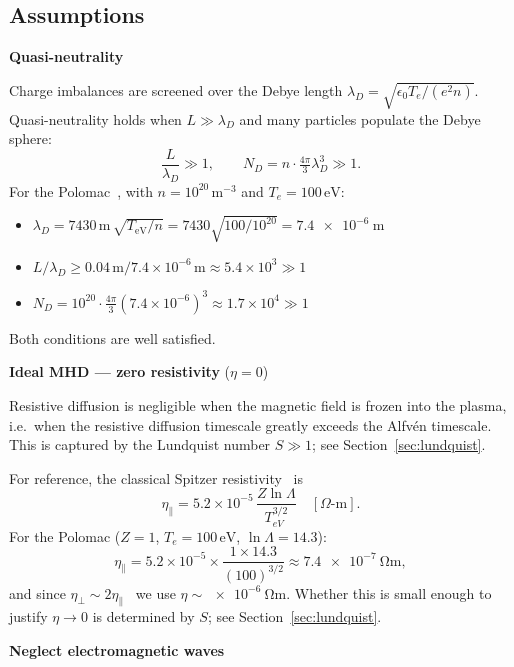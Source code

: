 \begin{enumerate}
{\subsection{Assumptions}


\item \textbf{Quasi-neutrality}

Charge imbalances are screened over the Debye length
$\lambda_D = \sqrt{\epsilon_0 T_e/(e^2 n)}$.  Quasi-neutrality holds
when $L \gg \lambda_D$ and many particles populate the Debye sphere:
\[
    \frac{L}{\lambda_D} \gg 1, \qquad
    N_D = n\cdot\tfrac{4\pi}{3}\lambda_D^3 \gg 1.
\]
For the Polomac~\cite{Elio2024}, with $n=10^{20}\,\text{m}^{-3}$ and
$T_e=100\,\text{eV}$:
\begin{itemize}
    \item $\lambda_D
          = 7430\,\text{m}\,\sqrt{T_\text{eV}/n}
          = 7430\sqrt{100/10^{20}}
          = \SI{7.4e-6}{\meter}$
    \item $L/\lambda_D
          \geq 0.04\,\text{m}/7.4\times10^{-6}\,\text{m}
          \approx 5.4\times10^3 \gg 1$
    \item $N_D
          = 10^{20}\cdot\tfrac{4\pi}{3}(7.4\times10^{-6})^3
          \approx 1.7\times10^4 \gg 1$
\end{itemize}
Both conditions are well satisfied.

\item \textbf{Ideal MHD — zero resistivity} ($\eta = 0$)

Resistive diffusion is negligible when the magnetic field is frozen into
the plasma, i.e.\ when the resistive diffusion timescale greatly exceeds
the Alfv\'en timescale.  This is captured by the Lundquist number
$S \gg 1$; see Section~\ref{sec:lundquist}.

For reference, the classical Spitzer resistivity~\cite{Chen2016} is
\[
    \eta_\parallel
    = 5.2\times10^{-5}\,\frac{Z\ln\Lambda}{T_{eV}^{3/2}}
    \quad[\Omega\text{-m}].
\]
For the Polomac ($Z=1$, $T_e=100\,\text{eV}$, $\ln\Lambda=14.3$):
\[
    \eta_\parallel
    = 5.2\times10^{-5}\times\frac{1\times14.3}{(100)^{3/2}}
    \approx \SI{7.4e-7}{\ohm\meter},
\]
and since $\eta_\perp\sim2\eta_\parallel$~\cite{Chen2016} we use
$\eta\sim\SI{e-6}{\ohm\meter}$.  Whether this is small enough to justify
$\eta\to0$ is determined by $S$; see Section~\ref{sec:lundquist}.

\item \textbf{Neglect electromagnetic waves}

}
\end{enumerate}
